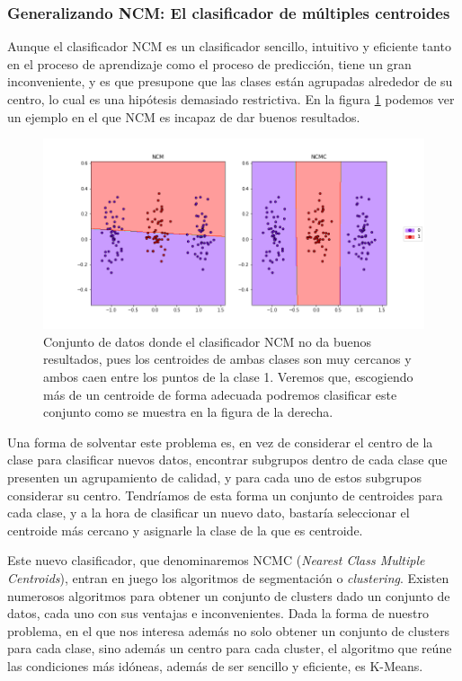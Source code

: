 \subsubsection{Generalizando NCM: El clasificador de múltiples centroides}

Aunque el clasificador NCM es un clasificador sencillo, intuitivo y eficiente tanto en el proceso de aprendizaje como el proceso de predicción, tiene un gran inconveniente, y es que presupone que las clases están agrupadas alrededor de su centro, lo cual es una hipótesis demasiado restrictiva. En la figura \ref{fig:problema_ncm} podemos ver un ejemplo en el que NCM es incapaz de dar buenos resultados.

\begin{figure}[h]
    \centering
    \includegraphics[width=1.0\textwidth]{images/ncm_problem.png}
    \caption{Conjunto de datos donde el clasificador NCM no da buenos resultados, pues los centroides de ambas clases son muy cercanos y ambos caen entre los puntos de la clase 1. Veremos que, escogiendo más de un centroide de forma adecuada podremos clasificar este conjunto como se muestra en la figura de la derecha.} \label{fig:problema_ncm}
\end{figure}

Una forma de solventar este problema es, en vez de considerar el centro de la clase para clasificar nuevos datos, encontrar subgrupos dentro de cada clase que presenten un agrupamiento de calidad, y para cada uno de estos subgrupos considerar su centro. Tendríamos de esta forma un conjunto de centroides para cada clase, y a la hora de clasificar un nuevo dato, bastaría seleccionar el centroide más cercano y asignarle la clase de la que es centroide.

Este nuevo clasificador, que denominaremos NCMC (\emph{Nearest Class Multiple Centroids}), entran en juego los algoritmos de segmentación o \emph{clustering}. Existen numerosos algoritmos \cite{clustering_algorithms} para obtener un conjunto de clusters dado un conjunto de datos, cada uno con sus ventajas e inconvenientes. Dada la forma de nuestro problema, en el que nos interesa además no solo obtener un conjunto de clusters para cada clase, sino además un centro para cada cluster, el algoritmo que reúne las condiciones más idóneas, además de ser sencillo y eficiente, es K-Means.

